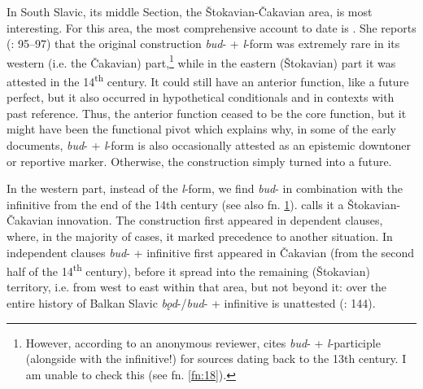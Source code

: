 \documentclass[output=paper,colorlinks,citecolor=brown]{langscibook}
\begin{document}
In South Slavic, its middle Section, the Štokavian-Čakavian area, is most interesting. For this area, the most comprehensive account to date is \citet{Grković-Mejdžor2012}. She reports (\citeyear{Grković-Mejdžor2012}: 95--97) that the original construction \textit{bud}- + \textit{l}-form was extremely rare in its western (i.e. the Čakavian) part,\footnote{\label{fn:22}However, according to an anonymous reviewer, \citet[350]{Lukežić2015} cites \textit{bud}- + \textit{l}-participle (alongside with the infinitive!) for sources dating back to the 13th century. I am unable to check this (see fn. \ref{fn:18}).} while in the eastern (Štokavian) part it was attested in the 14\textsuperscript{th} century. It could still have an anterior function, like a future perfect, but it also occurred in hypothetical conditionals and in contexts with past reference. Thus, the anterior function ceased to be the core function, but it might have been the functional pivot which explains why, in some of the early documents, \textit{bud}- + \textit{l}-form is also occasionally attested as an epistemic downtoner or reportive marker. Otherwise, the construction simply turned into a future. 

In the western part, instead of the \textit{l}-form, we find \textit{bud}- in combination with the infinitive from the end of the 14th century (see also fn. \ref{fn:22}). \citet[99]{Grković-Mejdžor2012} calls it a Štokavian-Čakavian innovation. The construction first appeared in dependent clauses, where, in the majority of cases, it marked precedence to another situation. In independent clauses \textit{bud}- + infinitive first appeared in Čakavian (from the second half of the 14\textsuperscript{th} century), before it spread into the remaining (Štokavian) territory, i.e. from west to east within that area, but not beyond it: over the entire history of Balkan Slavic \textit{bǫd}-/\textit{bud}- + infinitive is unattested (\cite{Ivanova-Mirčeva1962}: 144).
\end{document}
